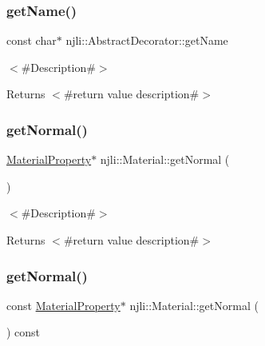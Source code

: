 \subsubsection{\texorpdfstring{get\+Name()}{getName()}}
{\footnotesize\ttfamily const char$\ast$ njli\+::\+Abstract\+Decorator\+::get\+Name}

$<$\#\+Description\#$>$

\begin{DoxyReturn}{Returns}
$<$\#return value description\#$>$ 
\end{DoxyReturn}
\mbox{\label{classnjli_1_1_material_a5823254059c86af02c20994309e081d8}} 
\subsubsection{\texorpdfstring{get\+Normal()}{getNormal()}\hspace{0.1cm}{\footnotesize\ttfamily [1/2]}}
{\footnotesize\ttfamily \mbox{\hyperlink{classnjli_1_1_material_property}{Material\+Property}}$\ast$ njli\+::\+Material\+::get\+Normal (\begin{DoxyParamCaption}{ }\end{DoxyParamCaption})}

$<$\#\+Description\#$>$

\begin{DoxyReturn}{Returns}
$<$\#return value description\#$>$ 
\end{DoxyReturn}
\mbox{\label{classnjli_1_1_material_a2447a2ed442e449ef17fa64fd850c9aa}} 
\subsubsection{\texorpdfstring{get\+Normal()}{getNormal()}\hspace{0.1cm}{\footnotesize\ttfamily [2/2]}}
{\footnotesize\ttfamily const \mbox{\hyperlink{classnjli_1_1_material_property}{Material\+Property}}$\ast$ njli\+::\+Material\+::get\+Normal (\begin{DoxyParamCaption}{ }\end{DoxyParamCaption}) const}

